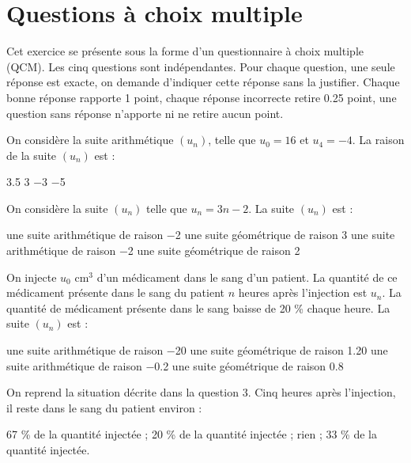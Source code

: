 \section{Questions à choix multiple}

Cet exercice se présente sous la forme d'un questionnaire à choix multiple (QCM). Les cinq questions sont indépendantes. Pour chaque question, une seule réponse est exacte, on demande d'indiquer cette réponse sans la justifier. Chaque bonne réponse rapporte 1 point, chaque réponse incorrecte retire \num{0.25} point, une question sans réponse n'apporte ni ne retire aucun point.

\begin{questions}
	\question[1] On considère la suite arithmétique $(u_n)$, telle que $u_0 = 16$ et $u_4 = -4$. La raison de la suite $(u_n)$ est :
	
	\begin{oneparcheckboxes}
		\choice \num{3.5}
		\choice \num{3}
		\choice \num{-3}
		\CorrectChoice \num{-5}
	\end{oneparcheckboxes} 

	\question[1] On considère la suite $(u_n)$ telle que $u_n = 3n - 2$. La suite $(u_n)$ est :
	
	\begin{checkboxes}
		\choice une suite arithmétique de raison \num{-2}
		\choice une suite géométrique de raison \num{3}
		\correctchoice une suite arithmétique de raison \num{-2}
		\choice une suite géométrique de raison \num{2}
	\end{checkboxes}

	\question[1] On injecte $u_0$ cm$^3$ d'un médicament dans le sang d'un patient. La quantité de ce médicament présente dans le sang du patient $n$ heures après l'injection est $u_n$. La quantité de médicament présente dans le sang baisse de 20 \% chaque heure.
	La suite $(u_n)$ est :
	
	\begin{checkboxes}
		\choice une suite arithmétique de raison \num{-20}
		\choice une suite géométrique de raison \num{1.20}
		\choice une suite arithmétique de raison \num{-0.2}
		\correctchoice une suite géométrique de raison \num{0.8}
	\end{checkboxes}

	\question[1] On reprend la situation décrite dans la question 3. Cinq heures après l'injection, il reste dans le sang du patient environ :
	
	\begin{checkboxes}
		\choice \num{67} \% de la quantité injectée ;
		\choice \num{20} \% de la quantité injectée ;
		\choice rien ;
		\CorrectChoice \num{33} \% de la quantité injectée.
	\end{checkboxes}


\end{questions}

